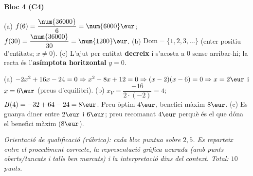 \begin{solucions}
\noindent\textbf{Bloc 4 (C4)}
\begin{sollist}\setcounter{enumi}{5}
  \item (a) $f(6)=\dfrac{\num{36000}}{6}=\num{6000}\eur$;
        $f(30)=\dfrac{\num{36000}}{30}=\num{1200}\eur$. \quad
        (b) $\mathrm{Dom}=\{1,2,3,\dots\}$ (enter positiu d'entitats; $x\neq 0$). \quad
        (c) L'ajut per entitat \textbf{decreix} i s'acosta a $0$ sense arribar-hi; la
        recta és l'\textbf{asímptota horitzontal} $y=0$.
  \item (a) $-2x^2+16x-24=0 \Rightarrow x^2-8x+12=0 \Rightarrow (x-2)(x-6)=0
        \Rightarrow x=2\eur$ i $x=6\eur$ (preus d'equilibri). \quad
        (b) $x_V=\dfrac{-16}{2\cdot(-2)}=4$; $B(4)=-32+64-24=8\eur$. Preu òptim
        $4\eur$, benefici màxim $8\eur$. \quad
        (c) Es guanya diner entre $2\eur$ i $6\eur$; preu recomanat $4\eur$ perquè és
        el que dóna el benefici màxim ($8\eur$).
\end{sollist}

\end{solucions}

\noindent\small\textit{Orientació de qualificació (rúbrica): cada bloc puntua sobre
$2,5$. Es reparteix entre el procediment correcte, la representació gràfica acurada
(amb punts oberts/tancats i talls ben marcats) i la interpretació dins del context.
Total: $10$ punts.}
